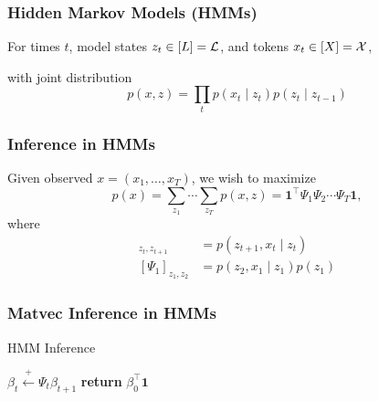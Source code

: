 \documentclass{beamer}
\begin{document}
\begin{frame}
\frametitle{Hidden Markov Models (HMMs)}

For times $t$, model states $z_t \in [L] = \mathcal{L}$, and tokens $x_t \in [X] = \mathcal{X}$,

\vspace{1em}

\begin{center}
\end{center}

\vspace{1em}
with joint distribution
$$p(x,z) = \prod_t p(x_t \mid z_t)p(z_t \mid z_{t-1})$$
\end{frame}

\begin{frame}
\frametitle{Inference in HMMs}
Given observed $x = (x_1, \ldots, x_T)$,
\vspace{1em}
we wish to maximize
\begin{equation*}
p(x)
= \sum_{z_1}\cdots\sum_{z_T}p(x, z)
= \bm1^\top\Psi_1\Psi_2\cdots\Psi_T\bm1,
\end{equation*}
where
\begin{align*}
[\Psi_{t}]_{z_t,z_{t+1}} &= p(z_{t+1},x_t \mid z_t)\\
[\Psi_{1}]_{z_1,z_2} &= p(z_2,x_1 \mid z_1)p(z_1)
\end{align*}
\end{frame}

\begin{frame}
\frametitle{Matvec Inference in HMMs}

\begin{algorithm}[H]
\caption{HMM Inference}
\begin{algorithmic}
\STATE $\beta_t \stackrel{+}{\gets} \Psi_t \beta_{t+1}$
\ENDFOR
\STATE \textbf{return} $\beta_0^\top \mathbf{1}$
\end{algorithmic}
\end{algorithm}
\end{frame}
\end{document}
